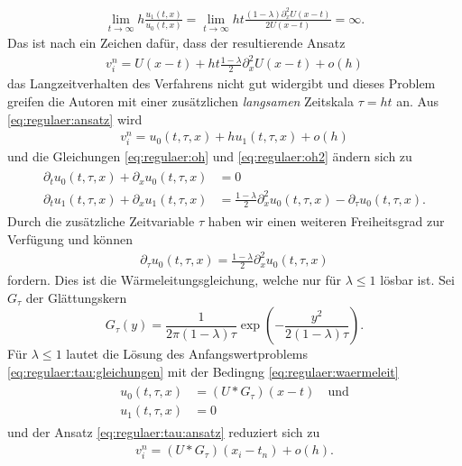 \begin{align*}
\lim_{t \to \infty} h \frac{u_1(t,x)}{u_0(t,x)} = \lim_{t \to \infty} h t \frac{(1-\lambda) \partial^2_x U(x-t) }{2 U(x-t)} = \infty.
\end{align*}
Das ist nach \cite{Junk2004} ein Zeichen dafür, dass der resultierende Ansatz
\begin{align}\label{eq:regulaer:ansatz:ergebnis}
v^n_i = U(x-t) + h t \frac{1-\lambda}{2} \partial^2_x U(x-t) + o(h)
\end{align}
das Langzeitverhalten des Verfahrens nicht gut widergibt und dieses Problem greifen die Autoren mit einer zusätzlichen \emph{langsamen} Zeitskala $\tau = h t$ an.
Aus \eqref{eq:regulaer:ansatz} wird
\begin{align}\label{eq:regulaer:tau:ansatz}
v^n_i = u_0(t, \tau, x) + h u_1(t, \tau, x) + o(h)
\end{align}
und die Gleichungen \eqref{eq:regulaer:oh} und \eqref{eq:regulaer:oh2} ändern sich zu
\begin{align}
\begin{split}
\label{eq:regulaer:tau:gleichungen}
\partial_t u_0(t,\tau,x) + \partial_x u_0(t,\tau,x) &= 0\\
\partial_t u_1(t,\tau,x) + \partial_x u_1(t,\tau,x) &= \frac{1-\lambda}{2} \partial^2_x u_0(t,\tau,x) - \partial_\tau u_0(t,\tau,x).
\end{split}
\end{align}
Durch die zusätzliche Zeitvariable $\tau$ haben wir einen weiteren Freiheitsgrad zur Verfügung und können
\begin{align}\label{eq:regulaer:waermeleit}
\partial_\tau u_0(t,\tau,x) = \frac{1-\lambda}{2} \partial^2_x u_0(t,\tau,x)
\end{align}
fordern. Dies ist die Wärmeleitungsgleichung, welche nur für $\lambda \leq 1$ lösbar ist.
Sei $G_\tau$ der Glättungskern
$$G_\tau(y) = \frac{1}{2 \pi (1-\lambda)\tau} \exp\left( - \frac{y^2}{2 (1 - \lambda) \tau} \right).$$
Für $\lambda \leq 1$ lautet  die Lösung des Anfangswertproblems \eqref{eq:regulaer:tau:gleichungen} mit der Bedingng \eqref{eq:regulaer:waermeleit}
\begin{align}
\begin{split}
u_0(t,\tau,x) &= (U * G_\tau)(x - t) \quad \text{und}\\
u_1(t,\tau,x) &= 0
\end{split}
\end{align}
und der Ansatz \eqref{eq:regulaer:tau:ansatz} reduziert sich zu
\begin{align}
v^n_i = (U * G_\tau)(x_i - t_n) + o(h).
\end{align}

